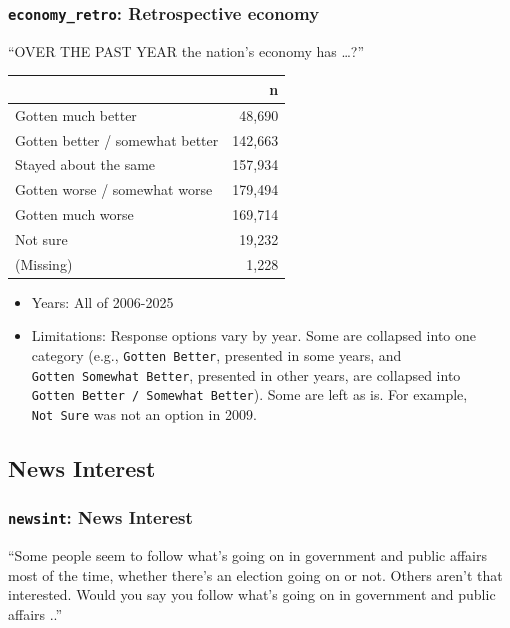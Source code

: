 \documentclass[10pt,article,oneside]{memoir}
\begin{document}
\subsubsection{\texorpdfstring{\texttt{economy\_retro}: Retrospective
economy}{economy\_retro: Retrospective economy}}\label{economy_retro-retrospective-economy}

``OVER THE PAST YEAR the nation's economy has \ldots?''

\begin{table}[H]
\centering
\begin{tabular}[t]{lr}
\toprule
 & n\\
\midrule
Gotten much better & 48,690\\
Gotten better / somewhat better & 142,663\\
Stayed about the same & 157,934\\
Gotten worse / somewhat worse & 179,494\\
Gotten much worse & 169,714\\
Not sure & 19,232\\
(Missing) & 1,228\\
\bottomrule
\end{tabular}
\end{table}

\begin{itemize}
\tightlist
\item
  Years: All of 2006-2025
\item
  Limitations: Response options vary by year. Some are collapsed into
  one category (e.g., \texttt{Gotten\ Better}, presented in some years,
  and \texttt{Gotten\ Somewhat\ Better}, presented in other years, are
  collapsed into \texttt{Gotten\ Better\ /\ Somewhat\ Better}). Some are
  left as is. For example, \texttt{Not\ Sure} was not an option in 2009.
\end{itemize}

\subsection{News Interest}\label{news-interest}

\subsubsection{\texorpdfstring{\texttt{newsint}: News
Interest}{newsint: News Interest}}\label{newsint-news-interest}

``Some people seem to follow what's going on in government and public
affairs most of the time, whether there's an election going on or not.
Others aren't that interested. Would you say you follow what's going on
in government and public affairs ..''
\end{document}
